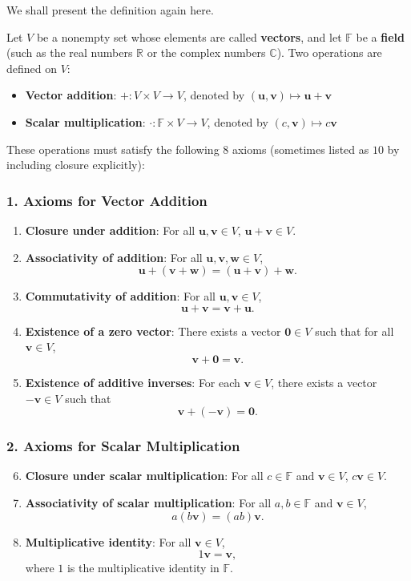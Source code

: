 \documentclass[oneside]{book}
\begin{document}
We shall present the definition again here.

Let $V$ be a nonempty set whose elements are called \textbf{vectors}, and let $\mathbb{F}$ be a \textbf{field} (such as the real numbers $\mathbb{R}$ or the complex numbers $\mathbb{C}$). Two operations are defined on $V$:

\begin{itemize}
    \item \textbf{Vector addition}: $+ : V \times V \to V$, denoted by $(\mathbf{u}, \mathbf{v}) \mapsto \mathbf{u} + \mathbf{v}$
    \item \textbf{Scalar multiplication}: $\cdot : \mathbb{F} \times V \to V$, denoted by $(c, \mathbf{v}) \mapsto c \mathbf{v}$
\end{itemize}

These operations must satisfy the following $8$ axioms (sometimes listed as $10$ by including closure explicitly):

\subsubsection*{1. Axioms for Vector Addition}
\begin{enumerate}
    \item \textbf{Closure under addition}: For all $\mathbf{u}, \mathbf{v} \in V$, $\mathbf{u} + \mathbf{v} \in V$.
    \item \textbf{Associativity of addition}: For all $\mathbf{u}, \mathbf{v}, \mathbf{w} \in V$,
    \[
    \mathbf{u} + (\mathbf{v} + \mathbf{w}) = (\mathbf{u} + \mathbf{v}) + \mathbf{w}.
    \]
    \item \textbf{Commutativity of addition}: For all $\mathbf{u}, \mathbf{v} \in V$,
    \[
    \mathbf{u} + \mathbf{v} = \mathbf{v} + \mathbf{u}.
    \]
    \item \textbf{Existence of a zero vector}: There exists a vector $\mathbf{0} \in V$ such that for all $\mathbf{v} \in V$,
    \[
    \mathbf{v} + \mathbf{0} = \mathbf{v}.
    \]
    \item \textbf{Existence of additive inverses}: For each $\mathbf{v} \in V$, there exists a vector $-\mathbf{v} \in V$ such that
    \[
    \mathbf{v} + (-\mathbf{v}) = \mathbf{0}.
    \]
\end{enumerate}

\subsubsection*{2. Axioms for Scalar Multiplication}
\begin{enumerate}
    \setcounter{enumi}{5}
    \item \textbf{Closure under scalar multiplication}: For all $c \in \mathbb{F}$ and $\mathbf{v} \in V$, $c \mathbf{v} \in V$.
    \item \textbf{Associativity of scalar multiplication}: For all $a, b \in \mathbb{F}$ and $\mathbf{v} \in V$,
    \[
    a (b \mathbf{v}) = (ab) \mathbf{v}.
    \]
    \item \textbf{Multiplicative identity}: For all $\mathbf{v} \in V$,
    \[
    1 \mathbf{v} = \mathbf{v},
    \]
    where $1$ is the multiplicative identity in $\mathbb{F}$.
\end{enumerate}
\end{document}
